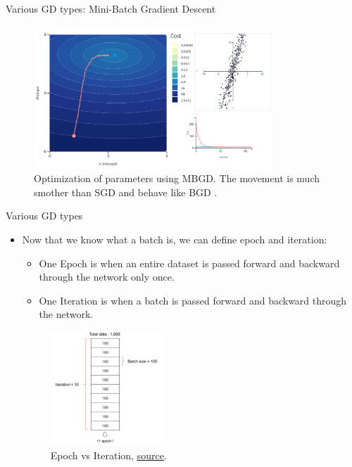 \documentclass[compress,oilve,t]{beamer}
\newcommand{\tc}[2]{
	\textcolor{#1}{\hspace{-2pt}#2\hspace{-2pt}}
}
\begin{document}
\begin{frame}{Various GD types: Mini-Batch Gradient Descent}
	\begin{figure}[H]
		\centering
		\includegraphics[width=0.8\textwidth]{Figs/mbgd.png}
		\caption{Optimization of parameters using MBGD. The movement is much smother than SGD and behave like BGD \cite{katanforoosh-kunin-opt}.}
	\end{figure} 
\end{frame}

\begin{frame}{Various GD types}
	\begin{itemize}
		\item Now that we know what a batch is, we can define epoch and iteration:
		\begin{itemize}
			\item One \tc{keywords}{Epoch} is when an entire dataset is passed forward and backward through the network only once.
			\item One \tc{keywords}{Iteration} is when a batch is passed forward and backward through the network. 
		\end{itemize}
		
		\begin{figure}[H]
			\centering
			\includegraphics[width=0.4\textwidth]{Figs/epoch-iteration.png}
			\caption{Epoch vs Iteration, \href{https://jerryan.medium.com/batch-size-a15958708a6}{source}.}
		\end{figure} 
	\end{itemize}
\end{frame}
\end{document}
